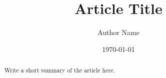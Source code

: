 \documentclass[11pt]{article}
\title{Article Title}
\author{Author Name}
\date{\today}
\begin{document}
\maketitle

\begin{abstract}
Write a short summary of the article here.
\end{abstract}









\end{document}
